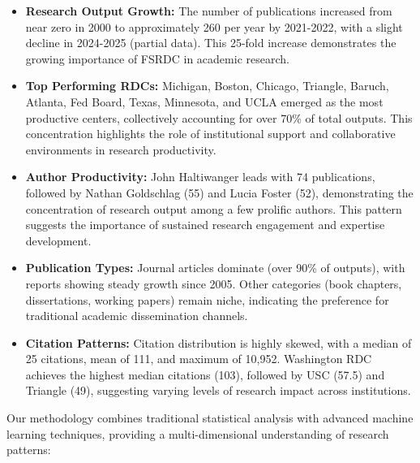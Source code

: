 \documentclass[12pt]{article}
\begin{document}
\begin{itemize}
    \item \textbf{Research Output Growth:} The number of publications increased from near zero in 2000 to approximately 260 per year by 2021-2022, with a slight decline in 2024-2025 (partial data). This 25-fold increase demonstrates the growing importance of FSRDC in academic research.
    
    \item \textbf{Top Performing RDCs:} Michigan, Boston, Chicago, Triangle, Baruch, Atlanta, Fed Board, Texas, Minnesota, and UCLA emerged as the most productive centers, collectively accounting for over 70\% of total outputs. This concentration highlights the role of institutional support and collaborative environments in research productivity.
    
    \item \textbf{Author Productivity:} John Haltiwanger leads with 74 publications, followed by Nathan Goldschlag (55) and Lucia Foster (52), demonstrating the concentration of research output among a few prolific authors. This pattern suggests the importance of sustained research engagement and expertise development.
    
    \item \textbf{Publication Types:} Journal articles dominate (over 90\% of outputs), with reports showing steady growth since 2005. Other categories (book chapters, dissertations, working papers) remain niche, indicating the preference for traditional academic dissemination channels.
    
    \item \textbf{Citation Patterns:} Citation distribution is highly skewed, with a median of 25 citations, mean of 111, and maximum of 10,952. Washington RDC achieves the highest median citations (103), followed by USC (57.5) and Triangle (49), suggesting varying levels of research impact across institutions.
\end{itemize}

Our methodology combines traditional statistical analysis with advanced machine learning techniques, providing a multi-dimensional understanding of research patterns:
\end{document}
